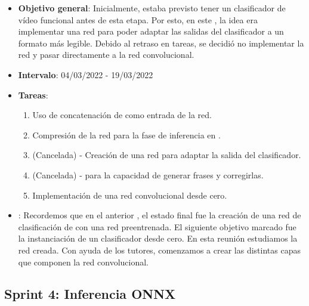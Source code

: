 \begin{itemize}
  \item  \textbf{Objetivo general}: Inicialmente, estaba previsto tener un clasificador de vídeo funcional antes de esta etapa. Por esto, en este , la idea era implementar una red  para poder adaptar las salidas del clasificador a un formato más legible. Debido al retraso en tareas, se decidió no implementar la red  y pasar directamente a la red convolucional.

  \item \textbf{Intervalo}: 04/03/2022 - 19/03/2022

  \item \textbf{Tareas}:
        \begin{enumerate}
          \item Uso de concatenación de  como entrada de la red.
          \item Compresión de la red para la fase de inferencia en .
          \item (Cancelada) - Creación de una red  para adaptar la salida del clasificador.
          \item (Cancelada) -  para la capacidad de generar frases y corregirlas.
          \item Implementación de una red convolucional desde cero.
        \end{enumerate}

  \item \textbf{}: Recordemos que en el anterior , el estado final fue la creación de una red de clasificación de  con una red preentrenada. El siguiente objetivo marcado fue la instanciación de un clasificador desde cero. En esta reunión estudiamos la red creada. Con ayuda de los tutores, comenzamos a crear las distintas capas que componen la red convolucional.
\end{itemize}

\subsection{Sprint 4: Inferencia ONNX}

